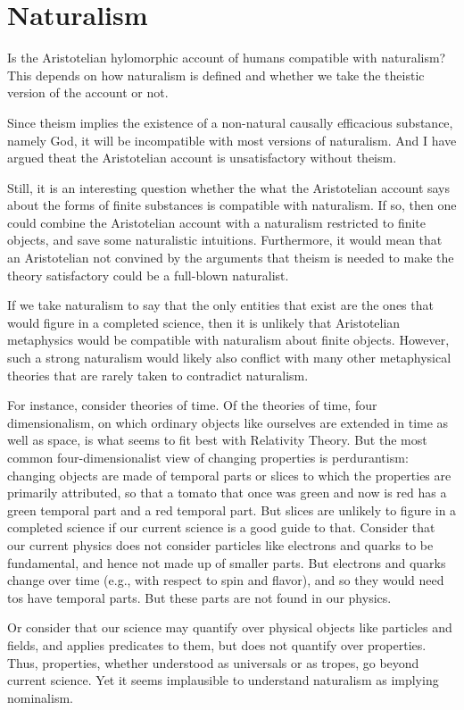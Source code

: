 \section{Naturalism}
Is the Aristotelian hylomorphic account of humans compatible with naturalism? This depends on how naturalism
is defined and whether we take the theistic version of the account or not.

Since theism implies the existence of a non-natural causally efficacious substance, namely God, it will be incompatible
with most versions of naturalism. And I have argued theat the Aristotelian account is unsatisfactory without
theism. 

Still, it is an interesting question whether the what the Aristotelian account says about the forms of finite
substances is compatible with naturalism. If so, then one could combine the Aristotelian account with 
a naturalism restricted to finite objects, and save some naturalistic intuitions. Furthermore, it would mean
that an Aristotelian not convined by the arguments that theism is needed to make the theory satisfactory could
be a full-blown naturalist.

If we take naturalism to say that the only entities that exist are the ones that would figure in a completed science,
then it is unlikely that Aristotelian metaphysics would be compatible with naturalism about finite objects. However,
such a strong naturalism would likely also conflict with many other metaphysical theories that are rarely taken to 
contradict naturalism. 

For instance, consider theories of time. Of the theories of time, four dimensionalism, on which
ordinary objects like ourselves are extended in time as well as space, is what seems to fit best with Relativity Theory. 
But the most common four-dimensionalist view of changing properties is perdurantism: changing objects are made of temporal parts or
slices to which the properties are primarily attributed, so that a tomato that once was green and now is red has a green temporal part
and a red temporal part. But slices are unlikely to figure in a completed science if
our current science is a good guide to that. Consider that our current physics does not consider particles
like electrons and quarks to be fundamental, and hence not made up of smaller parts. But electrons and quarks change over
time (e.g., with respect to spin and flavor), and so they would need tos have temporal parts.  But these parts are not found
in our physics. 

Or consider that our science may quantify over physical objects like particles and fields, and applies predicates to them, but 
does not quantify over properties. Thus, properties, whether understood as universals or as tropes, go beyond current science.
Yet it seems implausible to understand naturalism as implying nominalism.

